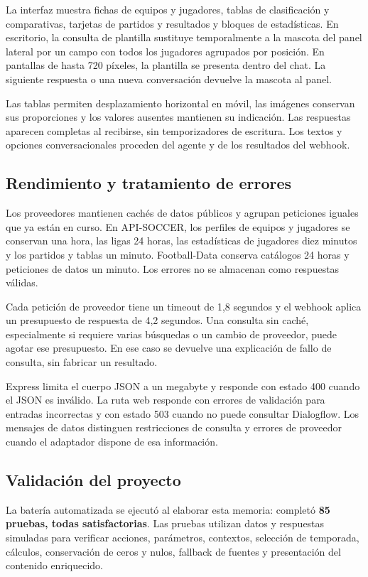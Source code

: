 \documentclass[11pt,a4paper]{article}
\newcommand{\codigo}[1]{\texttt{\detokenize{#1}}}
\begin{document}
La interfaz muestra fichas de equipos y jugadores, tablas de clasificación y comparativas, tarjetas de partidos y resultados y bloques de estadísticas. En escritorio, la consulta de plantilla sustituye temporalmente a la mascota del panel lateral por un campo con todos los jugadores agrupados por posición. En pantallas de hasta 720 píxeles, la plantilla se presenta dentro del chat. La siguiente respuesta o una nueva conversación devuelve la mascota al panel.

Las tablas permiten desplazamiento horizontal en móvil, las imágenes conservan sus proporciones y los valores ausentes mantienen su indicación. Las respuestas aparecen completas al recibirse, sin temporizadores de escritura. Los textos y opciones conversacionales proceden del agente y de los resultados del webhook.

\subsection{Rendimiento y tratamiento de errores}

Los proveedores mantienen cachés de datos públicos y agrupan peticiones iguales que ya están en curso. En API-SOCCER, los perfiles de equipos y jugadores se conservan una hora, las ligas 24 horas, las estadísticas de jugadores diez minutos y los partidos y tablas un minuto. Football-Data conserva catálogos 24 horas y peticiones de datos un minuto. Los errores no se almacenan como respuestas válidas.

Cada petición de proveedor tiene un timeout de 1,8 segundos y el webhook aplica un presupuesto de respuesta de 4,2 segundos. Una consulta sin caché, especialmente si requiere varias búsquedas o un cambio de proveedor, puede agotar ese presupuesto. En ese caso se devuelve una explicación de fallo de consulta, sin fabricar un resultado.

Express limita el cuerpo JSON a un megabyte y responde con estado 400 cuando el JSON es inválido. La ruta web responde con errores de validación para entradas incorrectas y con estado 503 cuando no puede consultar Dialogflow. Los mensajes de datos distinguen restricciones de consulta y errores de proveedor cuando el adaptador dispone de esa información.

\subsection{Validación del proyecto}

La batería automatizada se ejecutó al elaborar esta memoria: \codigo{npm test} completó \textbf{85 pruebas, todas satisfactorias}. Las pruebas utilizan datos y respuestas simuladas para verificar acciones, parámetros, contextos, selección de temporada, cálculos, conservación de ceros y nulos, fallback de fuentes y presentación del contenido enriquecido.
\end{document}
